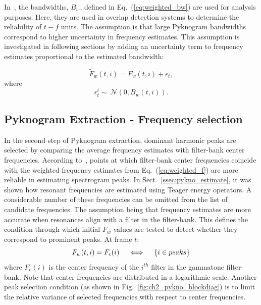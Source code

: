 {In~\cite{potamianos_maragos_jasa96}, the bandwidths, $B_w$, defined in Eq.~(\ref{eq:weighted_bw}) are used for analysis purposes. 
Here, they are used in overlap detection systems to determine the reliability of $t-f$ units. 
The assumption is that large Pyknogram bandwidths correspond to higher uncertainty in frequency estimates. 
This assumption is investigated in following sections by adding an uncertainty term to frequency estimates proportional to the estimated bandwidth:

\begin{equation}
\label{eq:jitter_f}
\tilde F_w(t,i) = F_w(t,i) + \epsilon_t,
\end{equation}
where
\begin{equation}
\label{eq:jitter_pdf}
\epsilon^i_t \sim\ \mathcal{N}(0,B_w(t,i)).
\end{equation}

\subsection{Pyknogram Extraction - Frequency selection}
\label{sssec:pykno_select}
In the second step of Pyknogram extraction, dominant harmonic peaks are selected by comparing the average frequency estimates with filter-bank center frequencies. 
According to~\cite{potamianos_maragos_jasa96}, points at which filter-bank center frequencies coincide with the weighted frequency estimates from Eq.~(\ref{eq:weighted_f}) are more reliable in estimating spectrogram peaks. 
In Sect.~\ref{ssec:pykno_estimate}, it was shown how resonant frequencies are estimated using Teager energy operators. 
A considerable number of these frequencies can be omitted from the list of candidate frequencies. 
The assumption being that frequency estimates are more accurate when resonances align with a filter in the filter-bank. 
This defines the condition through which initial $F_w$ values are tested to detect whether they correspond to prominent peaks. At frame $t$: 
\vspace{0mm}
\begin{equation}
\label{eq:RF1}
F_w(t,i) = F_c(i)  \quad \iff \quad \{i \in peaks\}
\vspace{1mm}
\end{equation}
where $F_c(i)$ is the center frequency of the $i^{th}$ filter in the gammatone filter-bank. 
Note that center frequencies are distributed in a logarithmic scale. 
Another peak selection condition (as shown in Fig.~\ref{fig:ch2_pykno_blockdiag}) is to limit the relative variance of selected frequencies with respect to center frequencies. 

}
